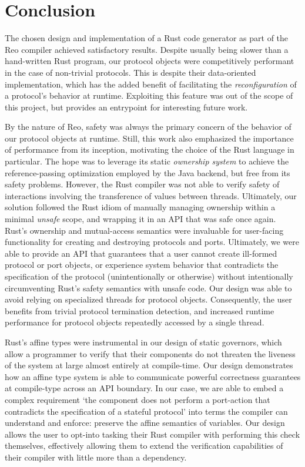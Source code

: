 \section{Conclusion}

The chosen design and implementation of a Rust code generator as part of the Reo compiler achieved satisfactory results. Despite usually being slower than a hand-written Rust program, our protocol objects were competitively performant in the case of non-trivial protocols. This is despite their data-oriented implementation, which has the added benefit of facilitating the \textit{reconfiguration} of a protocol's behavior at runtime. Exploiting this feature was out of the scope of this project, but provides an entrypoint for interesting future work.

By the nature of Reo, safety was always the primary concern of the behavior of our protocol objects at runtime. Still, this work also emphasized the importance of performance from its inception, motivating the choice of the Rust language in particular. The hope was to leverage its static \textit{ownership system} to achieve the reference-passing optimization employed by the Java backend, but free from its safety problems. However, the Rust compiler was not able to verify safety of interactions involving the transference of values between threads. Ultimately, our solution followed the Rust idiom of manually managing ownership within a minimal \textit{unsafe} scope, and wrapping it in an API that was safe once again. Rust's ownership and mutual-access semantics were invaluable for user-facing functionality for creating and destroying protocols and ports. Ultimately, we were able to provide an API that guarantees that a user cannot create ill-formed protocol or port objects, or experience system behavior that contradicts the specification of the protocol (unintentionally or otherwise) without intentionally circumventing Rust's safety semantics with unsafe code. Our design was able to avoid relying on specialized threads for protocol objects. Consequently, the user benefits from trivial protocol termination detection, and increased runtime performance for protocol objects repeatedly accessed by a single thread.

Rust's affine types were instrumental in our design of static governors, which allow a programmer to verify that their components do not threaten the liveness of the system at large almost entirely at compile-time. Our design demonstrates how an affine type system is able to communicate powerful correctness guarantees at compile-type across an API boundary. In our case, we are able to embed a complex requirement `the component does not perform a port-action that contradicts the specification of a stateful protocol' into terms the compiler can understand and enforce: preserve the affine semantics of variables. Our design allows the user to opt-into tasking their Rust compiler with performing this check themselves, effectively allowing them to extend the verification capabilities of their compiler with little more than a dependency. 


